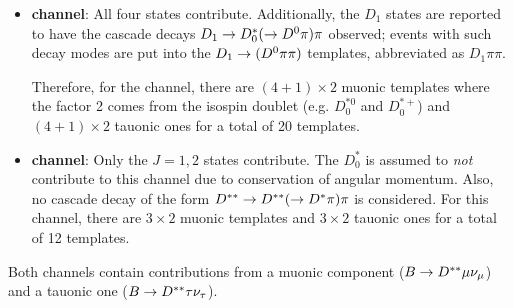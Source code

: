 \begin{itemize}
    \item \textbf{\Dz channel}:
        All four states contribute.
        Additionally, the $D_1$ states are reported to have the cascade decays
        $D_1 \rightarrow D_0^* (\rightarrow {\ensuremath{{D}^0}} \pi) \pi$ observed;
        events with such decay modes are put into the
        $D_1 \rightarrow ({{D}^0} \pi\pi)$ templates,
        abbreviated as $D_1 \pi\pi$.

        Therefore, for the \Dz channel,
        there are $(4+1) \times 2$ muonic templates where the factor 2 comes
        from the isospin doublet (e.g. $D_0^{*0}$ and $D_0^{*+}$)
        and $(4+1) \times 2$ tauonic ones for a total of 20 \Dstst templates.

    \item \textbf{\Dstar channel}:
        Only the $J = 1,2$ states contribute.
        The $D_0^*$ is assumed to \emph{not} contribute to this channel due
        to conservation of angular momentum.
        Also, no cascade decay of the form
        $D^{**} \rightarrow D^{**} (\rightarrow {\ensuremath{{D}^*}} \pi) \pi$ is considered.
        For this channel,
        there are $3 \times 2$ muonic templates
        and $3 \times 2$ tauonic ones for a total of 12 \Dstst templates.
\end{itemize}

Both channels contain contributions from a muonic \Dstst component
($B \rightarrow D^{**} {\mu}{{\nu}_\mu}$) and a tauonic one
($B \rightarrow D^{**} {\tau}{{\nu}_\tau}$).

